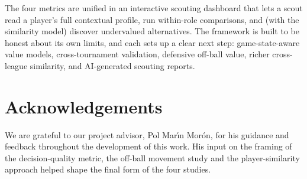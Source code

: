 \documentclass[12pt,a4paper]{article}
\begin{document}
The four metrics are unified in an interactive scouting dashboard that lets a scout read a player's full contextual profile, run within-role comparisons, and (with the similarity model) discover undervalued alternatives.
The framework is built to be honest about its own limits, and each sets up a clear next step: game-state-aware value models, cross-tournament validation, defensive off-ball value, richer cross-league similarity, and AI-generated scouting reports.

\clearpage
\section*{Acknowledgements}

We are grateful to our project advisor, Pol Mar\'{\i}n Mor\'{o}n, for his guidance and feedback throughout the development of this work. His input on the framing of the decision-quality metric, the off-ball movement study and the player-similarity approach helped shape the final form of the four studies.
\end{document}
